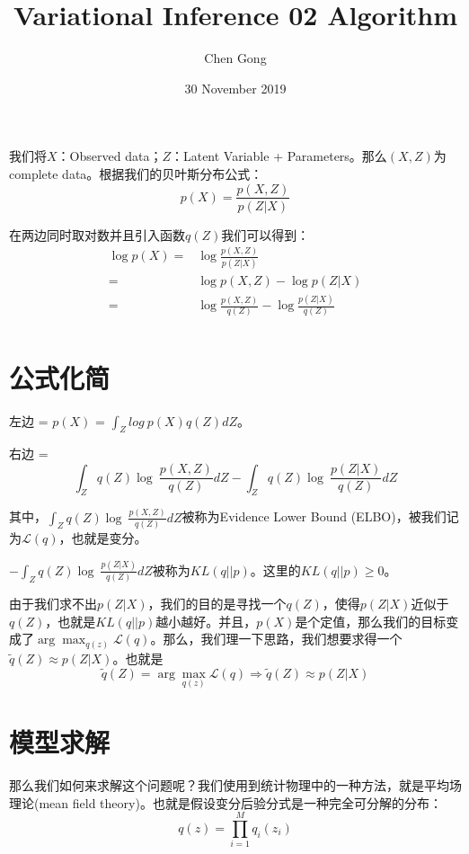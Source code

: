 \documentclass[a4paper]{article}
\title{Variational Inference 02 Algorithm}
\author{Chen Gong}
\date{30 November 2019}
\begin{document}
\maketitle
我们将$X$：Observed data；$Z$：Latent Variable + Parameters。那么$(X,Z)$为complete data。根据我们的贝叶斯分布公式：
\begin{equation}
    p(X) = \frac{p(X,Z)}{p(Z|X)}
\end{equation}

在两边同时取对数并且引入函数$q(Z)$我们可以得到：
\begin{equation}
    \begin{split}
        \log p(X) = & \log \frac{p(X,Z)}{p(Z|X)} \\
        = & \log p(X,Z) - \log p(Z|X) \\
        = & \log\frac{p(X,Z)}{q(Z)} - \log \frac{p(Z|X)}{q(Z)} \\
    \end{split}
\end{equation}

\section{公式化简}
左边 = $p(X)$ = $\int_{Z}log\ p(X)q(Z)dZ$。

右边 = 
\begin{equation}
    \int_Z q(Z)\log\ \frac{p(X,Z)}{q(Z)}dZ - \int_Z q(Z)\log\ \frac{p(Z|X)}{q(Z)}dZ
\end{equation}

其中，$\int_Z q(Z)\log\ \frac{p(X,Z)}{q(Z)}dZ$被称为Evidence Lower Bound (ELBO)，被我们记为$\mathcal{L}(q)$，也就是变分。

$- \int_Z q(Z)\log\ \frac{p(Z|X)}{q(Z)}dZ$被称为$KL(q||p)$。这里的$KL(q||p) \geq 0$。

由于我们求不出$p(Z|X)$，我们的目的是寻找一个$q(Z)$，使得$p(Z|X)$近似于$q(Z)$，也就是$KL(q||p)$越小越好。并且，$p(X)$是个定值，那么我们的目标变成了$\arg\max_{q(z)}\mathcal{L}(q)$。那么，我们理一下思路，我们想要求得一个$\widetilde{q}(Z) \approx p(Z|X)$。也就是
\begin{equation}
    \widetilde{q}(Z) = \arg\max_{q(z)} \mathcal{L}(q) \Rightarrow \widetilde{q}(Z) \approx p(Z|X)
\end{equation}

\section{模型求解}
那么我们如何来求解这个问题呢？我们使用到统计物理中的一种方法，就是平均场理论(mean field theory)。也就是假设变分后验分式是一种完全可分解的分布：
\begin{equation}
    q(z) = \prod_{i=1}^M q_i(z_i)
\end{equation}
\end{document}
